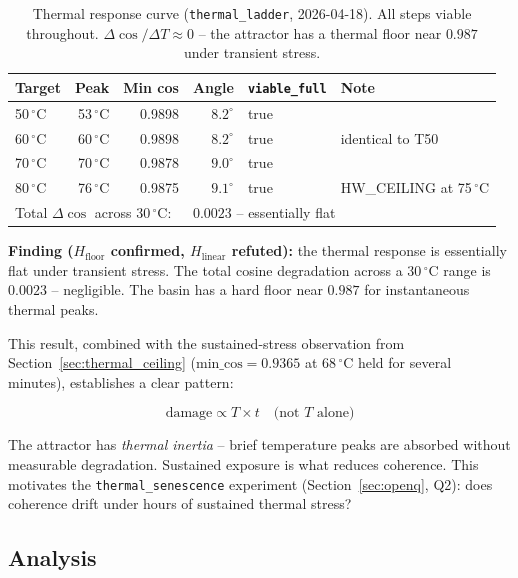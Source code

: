 \documentclass[11pt, a4paper]{article}
\begin{document}
\begin{table}[h]
\centering
\begin{tabular}{lrrrll}
\toprule
Target & Peak & Min cos & Angle & \texttt{viable\_full} & Note \\
\midrule
50\,$^\circ$C & 53\,$^\circ$C & 0.9898 & $8.2^\circ$ & true & \\
60\,$^\circ$C & 60\,$^\circ$C & 0.9898 & $8.2^\circ$ & true & identical to T50 \\
70\,$^\circ$C & 70\,$^\circ$C & 0.9878 & $9.0^\circ$ & true & \\
80\,$^\circ$C & 76\,$^\circ$C & 0.9875 & $9.1^\circ$ & true & HW\_CEILING at 75\,$^\circ$C \\
\midrule
\multicolumn{3}{l}{Total $\Delta\cos$ across 30\,$^\circ$C:} & \multicolumn{3}{l}{$0.0023$ -- essentially flat} \\
\bottomrule
\end{tabular}
\caption{Thermal response curve (\texttt{thermal\_ladder}, 2026-04-18).
All steps viable throughout.
$\Delta\cos/\Delta T \approx 0$ -- the attractor has a thermal floor near $0.987$
under transient stress.}
\label{tab:ladder}
\end{table}

\textbf{Finding ($H_\text{floor}$ confirmed, $H_\text{linear}$ refuted):}
the thermal response is essentially flat under transient stress.
The total cosine degradation across a $30\,^\circ\mathrm{C}$ range is $0.0023$ --
negligible.
The basin has a hard floor near $0.987$ for instantaneous thermal peaks.

This result, combined with the sustained-stress observation from
Section~\ref{sec:thermal_ceiling} ($\text{min\_cos} = 0.9365$ at $68\,^\circ\mathrm{C}$
held for several minutes), establishes a clear pattern:

\begin{equation}
  \text{damage} \propto T \times t \quad \text{(not } T \text{ alone)}
\label{eq:damage}
\end{equation}

The attractor has \emph{thermal inertia} -- brief temperature peaks are
absorbed without measurable degradation.
Sustained exposure is what reduces coherence.
This motivates the \texttt{thermal\_senescence} experiment
(Section~\ref{sec:openq}, Q2): does coherence drift under hours of
sustained thermal stress?

\subsection{Analysis}
\end{document}

